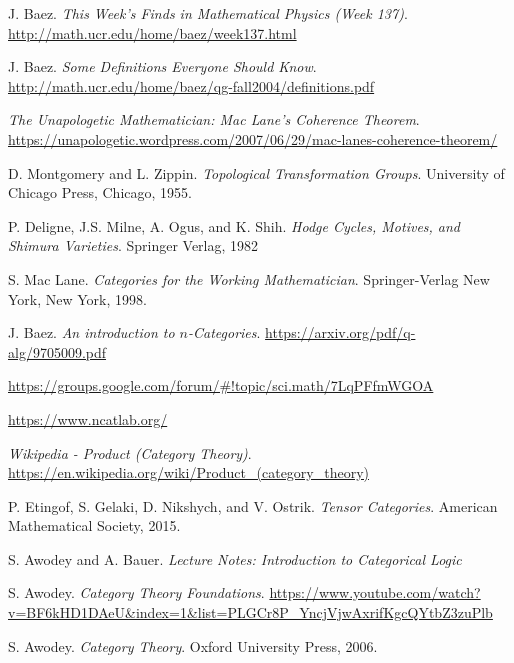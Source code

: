 \documentclass[a4paper,10pt]{scrreprt}
\theoremstyle{definition}
\theoremstyle{plain}
\theoremstyle{remark}
\begin{document}
\begin{thebibliography}{9}
   J. Baez.
    \textit{This Week's Finds in Mathematical Physics (Week 137)}.
    \url{http://math.ucr.edu/home/baez/week137.html}

   J. Baez.
    \textit{Some Definitions Everyone Should Know}.
    \url{http://math.ucr.edu/home/baez/qg-fall2004/definitions.pdf}

    \textit{The Unapologetic Mathematician: Mac Lane's Coherence Theorem}.
    \url{https://unapologetic.wordpress.com/2007/06/29/mac-lanes-coherence-theorem/}

   D. Montgomery and L. Zippin. 
    \textit{Topological Transformation Groups}.
    University of Chicago Press, Chicago, 1955.

   P. Deligne, J.S. Milne, A. Ogus, and K. Shih.
    \textit{Hodge Cycles, Motives, and Shimura Varieties}.
    Springer Verlag, 1982

   S. Mac Lane.
    \textit{Categories for the Working Mathematician}.
    Springer-Verlag New York, New York, 1998.

   J. Baez. 
    \textit{An introduction to $n$-Categories}.
    \url{https://arxiv.org/pdf/q-alg/9705009.pdf}

    \url{https://groups.google.com/forum/#!topic/sci.math/7LqPFfmWGOA}

    \url{https://www.ncatlab.org/}

    \textit{Wikipedia - Product (Category Theory)}.
    \url{https://en.wikipedia.org/wiki/Product\_(category\_theory)}

   P. Etingof, S. Gelaki, D. Nikshych, and V. Ostrik.
    \textit{Tensor Categories}.
    American Mathematical Society, 2015.

   S. Awodey and A. Bauer.
    \textit{Lecture Notes: Introduction to Categorical Logic}

   S. Awodey.
    \textit{Category Theory Foundations}.
    \url{https://www.youtube.com/watch?v=BF6kHD1DAeU&index=1&list=PLGCr8P\_YncjVjwAxrifKgcQYtbZ3zuPlb}

   S. Awodey.
    \textit{Category Theory}.
    Oxford University Press, 2006.


\end{thebibliography}
\end{document}
